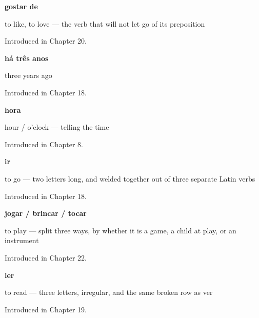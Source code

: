 \noindent\begin{minipage}[t]{\linewidth}
\raggedright
\textbf{gostar de}\par
\small to like, to love — the verb that will not let go of its preposition\par
\footnotesize Introduced in Chapter 20.
\end{minipage}\par\medskip

\noindent\begin{minipage}[t]{\linewidth}
\raggedright
\textbf{há três anos}\par
\small three years ago\par
\footnotesize Introduced in Chapter 18.
\end{minipage}\par\medskip

\noindent\begin{minipage}[t]{\linewidth}
\raggedright
\textbf{hora}\par
\small hour / o'clock — telling the time\par
\footnotesize Introduced in Chapter 8.
\end{minipage}\par\medskip

\noindent\begin{minipage}[t]{\linewidth}
\raggedright
\textbf{ir}\par
\small to go — two letters long, and welded together out of three separate Latin verbs\par
\footnotesize Introduced in Chapter 18.
\end{minipage}\par\medskip

\noindent\begin{minipage}[t]{\linewidth}
\raggedright
\textbf{jogar / brincar / tocar}\par
\small to play — split three ways, by whether it is a game, a child at play, or an instrument\par
\footnotesize Introduced in Chapter 22.
\end{minipage}\par\medskip

\noindent\begin{minipage}[t]{\linewidth}
\raggedright
\textbf{ler}\par
\small to read — three letters, irregular, and the same broken row as ver\par
\footnotesize Introduced in Chapter 19.
\end{minipage}\par\medskip

